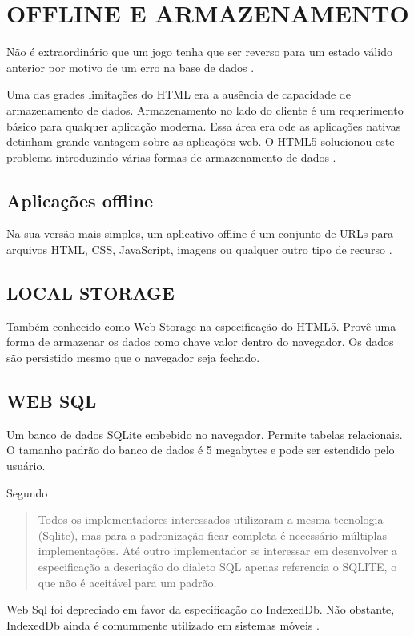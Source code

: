 \section{OFFLINE E ARMAZENAMENTO}
Não é extraordinário que um jogo tenha que ser reverso para um estado
válido anterior por motivo de um erro na base de dados \autocite[pp.
5]{browserGamesTechnologyAndFuture}.

Uma das grades limitações do HTML era a ausência de capacidade
de armazenamento de dados. Armazenamento no lado do cliente é um
requerimento básico para qualquer aplicação moderna. Essa área
era ode as aplicações nativas detinham grande vantagem sobre as
aplicações web. O HTML5 solucionou este problema introduzindo várias
formas de armazenamento de dados \autocite{html5Tradeoffs}.

\subsection{Aplicações offline}
Na sua versão mais simples, um aplicativo offline é um conjunto de
URLs para arquivos HTML, CSS, JavaScript, imagens ou qualquer outro tipo
de recurso \autocite{diveIntohtml}.

\subsection{LOCAL STORAGE}
Também conhecido como Web Storage na especificação do HTML5. Provê
uma forma de armazenar os dados como chave valor dentro do navegador. Os
dados são persistido mesmo que o navegador seja fechado.

\subsection{WEB SQL}
Um banco de dados SQLite embebido no navegador. Permite
tabelas relacionais. O tamanho padrão do banco de dados é 5 megabytes
e pode ser estendido pelo usuário.

Segundo \cite{diveIntohtml}
\begin{quote}
Todos os implementadores interessados utilizaram a mesma tecnologia
(Sqlite), mas para a padronização ficar completa é necessário
múltiplas implementações. Até outro implementador se interessar
em desenvolver a especificação a descriação do dialeto SQL apenas
referencia o SQLITE, o que não é aceitável para um padrão.
\end{quote}

Web Sql foi depreciado em favor da especificação do IndexedDb.
Não obstante, IndexedDb ainda é comummente utilizado em sistemas móveis \autocite{html5Test}.

